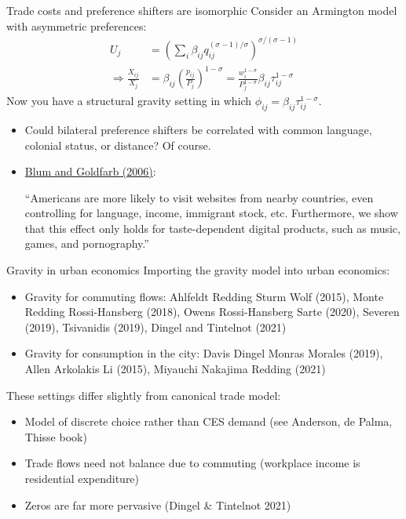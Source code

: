 \documentclass[10pt,notes=hide]{beamer}
\begin{document}
\begin{frame}{Trade costs and preference shifters are isomorphic}
Consider an Armington model with asymmetric preferences:
\begin{align*}
	U_j &= \left(\sum_{i} \beta_{ij} q_{ij}^{(\sigma-1)/\sigma}\right)^{\sigma/(\sigma-1)}
	\\
	\Rightarrow
	\frac{X_{ij}}{X_j} &= \beta_{ij} \left(\frac{p_{ij}}{P_j}\right)^{1-\sigma} 
	=
	\frac{w_i^{1-\sigma}}{P_j^{1-\sigma}}\beta_{ij}\tau_{ij}^{1-\sigma}
\end{align*}
Now you have a structural gravity setting in which $\phi_{ij}=\beta_{ij}\tau_{ij}^{1-\sigma}$.
\begin{itemize}
	\item Could bilateral preference shifters be correlated with common language, colonial status, or distance? Of course. 
	\item \href{https://www.sciencedirect.com/science/article/pii/S0022199606000225}{Blum and Goldfarb (2006)}: {\small ``Americans are more likely to visit websites from nearby countries, even controlling for language, income, immigrant stock, etc. Furthermore, we show that this effect only holds for taste-dependent digital products, such as music, games, and pornography.''\par}
\end{itemize}
\end{frame}
\begin{frame}{Gravity in urban economics}
Importing the gravity model into urban economics:
\begin{itemize}
	\item Gravity for commuting flows: 
	Ahlfeldt Redding Sturm Wolf (2015), Monte Redding Rossi-Hansberg (2018), Owens Rossi-Hansberg Sarte (2020), Severen (2019), Tsivanidis (2019), Dingel and Tintelnot (2021)
	\item Gravity for consumption in the city:
	Davis Dingel Monras Morales (2019), Allen Arkolakis Li (2015), Miyauchi Nakajima Redding (2021)
\end{itemize}
These settings differ slightly from canonical trade model: 
\begin{itemize}
	\item Model of discrete choice rather than CES demand (see Anderson, de Palma, Thisse book)
	\item Trade flows need not balance due to commuting (workplace income is residential expenditure)
	\item Zeros are far more pervasive (Dingel \& Tintelnot 2021)
\end{itemize}
\end{frame}
\end{document}
